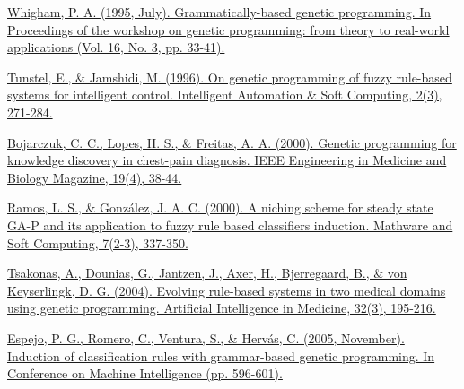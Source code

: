 \begin{thebibliography}{9}

	\href{https://www.researchgate.net/profile/Pa-Whigham/publication/2450222_Grammatically-based_Genetic_Programming/links/55c3c89908aebc967df1b765/Grammatically-based-Genetic-Programming.pdf}{Whigham, P. A. (1995, July). Grammatically-based genetic programming. In Proceedings of the workshop on genetic programming: from theory to real-world applications (Vol. 16, No. 3, pp. 33-41).}


	\href{https://www.tandfonline.com/doi/abs/10.1080/10798587.1996.10750674}{Tunstel, E., \& Jamshidi, M. (1996). On genetic programming of fuzzy rule-based systems for intelligent control. Intelligent Automation \& Soft Computing, 2(3), 271-284.}


	\href{https://ieeexplore.ieee.org/document/853480}{Bojarczuk, C. C., Lopes, H. S., \& Freitas, A. A. (2000). Genetic programming for knowledge discovery in chest-pain diagnosis. IEEE Engineering in Medicine and Biology Magazine, 19(4), 38-44.}


	\href{http://dmle.icmat.es/revistas/detalle.php?numero=1954}{Ramos, L. S., \& González, J. A. C. (2000). A niching scheme for steady state GA-P and its application to fuzzy rule based classifiers induction. Mathware and Soft Computing, 7(2-3), 337-350.}


	\href{https://www.sciencedirect.com/science/article/pii/S0933365704001058}{Tsakonas, A., Dounias, G., Jantzen, J., Axer, H., Bjerregaard, B., \& von Keyserlingk, D. G. (2004). Evolving rule-based systems in two medical domains using genetic programming. Artificial Intelligence in Medicine, 32(3), 195-216.}


	\href{https://www.researchgate.net/profile/Sebastian-Ventura/publication/228722056_C_Induction_of_Classification_Rules_with_Grammar-Based_Genetic_Programming/links/09e41510a07a3e3047000000/C-Induction-of-Classification-Rules-with-Grammar-Based-Genetic-Programming.pdf}{Espejo, P. G., Romero, C., Ventura, S., \& Hervás, C. (2005, November). Induction of classification rules with grammar-based genetic programming. In Conference on Machine Intelligence (pp. 596-601).}



\end{thebibliography}
